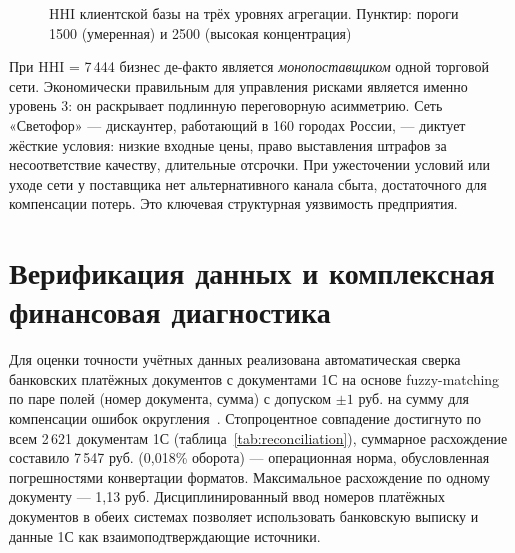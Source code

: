\begin{figure}[H]
\centering
{}
\caption{HHI клиентской базы на трёх уровнях агрегации. Пунктир: пороги 1500 (умеренная) и 2500 (высокая концентрация)}
\label{fig:hhi_chart}
\end{figure}

При HHI = 7\,444 бизнес де-факто является \textit{монопоставщиком} одной торговой сети. Экономически правильным для управления рисками является именно уровень 3: он раскрывает подлинную переговорную асимметрию. Сеть «Светофор» --- дискаунтер, работающий в 160 городах России, --- диктует жёсткие условия: низкие входные цены, право выставления штрафов за несоответствие качеству, длительные отсрочки. При ужесточении условий или уходе сети у поставщика нет альтернативного канала сбыта, достаточного для компенсации потерь. Это ключевая структурная уязвимость предприятия.

\section{Верификация данных и комплексная финансовая диагностика}
\label{sec:reconciliation}

Для оценки точности учётных данных реализована автоматическая сверка банковских платёжных документов с документами 1С на основе fuzzy-matching по паре полей (номер документа, сумма) с допуском $\pm 1$ руб. на сумму для компенсации ошибок округления~\cite{whittington2012principles}. Стопроцентное совпадение достигнуто по всем 2\,621 документам 1С (таблица~\ref{tab:reconciliation}), суммарное расхождение составило 7\,547 руб. (0,018\% оборота) --- операционная норма, обусловленная погрешностями конвертации форматов. Максимальное расхождение по одному документу --- 1,13 руб. Дисциплинированный ввод номеров платёжных документов в обеих системах позволяет использовать банковскую выписку и данные 1С как взаимоподтверждающие источники.

